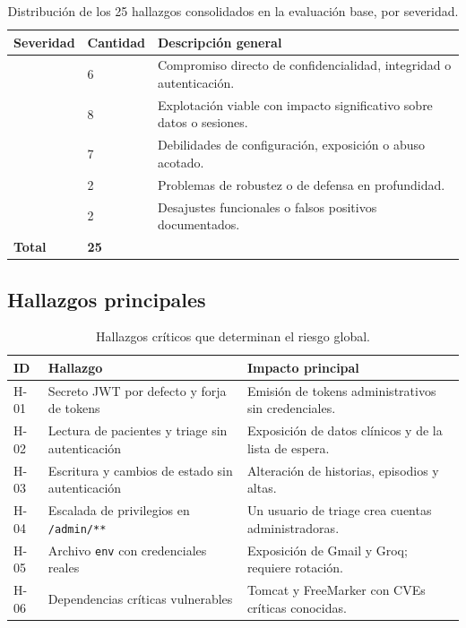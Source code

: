 \begin{table}[htbp]
\centering
\caption{Distribución de los 25 hallazgos consolidados en la evaluación base, por severidad.}
\label{tab:severidad}
\begin{tabular}{@{}L{4.2cm}C{2.4cm}L{7.6cm}@{}}
\toprule
\textbf{Severidad} & \textbf{Cantidad} & \textbf{Descripción general}\\
\midrule
{} & 6 & Compromiso directo de confidencialidad, integridad o autenticación.\\
 & 8 & Explotación viable con impacto significativo sobre datos o sesiones.\\
 & 7 & Debilidades de configuración, exposición o abuso acotado.\\
 & 2 & Problemas de robustez o de defensa en profundidad.\\
 & 2 & Desajustes funcionales o falsos positivos documentados.\\
\midrule
\textbf{Total} & \textbf{25} & \\
\bottomrule
\end{tabular}
\end{table}

\subsection{Hallazgos principales}

\begin{table}[htbp]
\centering
\caption{Hallazgos críticos que determinan el riesgo global.}
\label{tab:criticos-resumen}
\begin{tabular}{@{}L{1.3cm}L{7.5cm}L{6.0cm}@{}}
\toprule
\textbf{ID} & \textbf{Hallazgo} & \textbf{Impacto principal}\\
\midrule
H-01 & Secreto JWT por defecto y forja de tokens & Emisión de tokens administrativos sin credenciales.\\
H-02 & Lectura de pacientes y triage sin autenticación & Exposición de datos clínicos y de la lista de espera.\\
H-03 & Escritura y cambios de estado sin autenticación & Alteración de historias, episodios y altas.\\
H-04 & Escalada de privilegios en \texttt{/admin/**} & Un usuario de triage crea cuentas administradoras.\\
H-05 & Archivo \texttt{env} con credenciales reales & Exposición de Gmail y Groq; requiere rotación.\\
H-06 & Dependencias críticas vulnerables & Tomcat y FreeMarker con CVEs críticas conocidas.\\
\bottomrule
\end{tabular}
\end{table}

